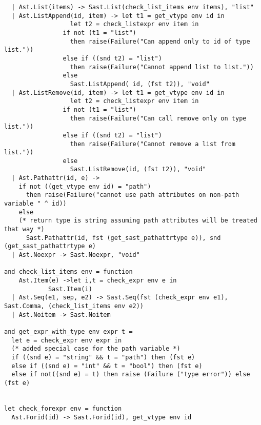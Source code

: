 \documentclass[11pt]{article}
\begin{document}
\begin{listing}[H]
  \begin{verbatim}
  | Ast.List(items) -> Sast.List(check_list_items env items), "list"
  | Ast.ListAppend(id, item) -> let t1 = get_vtype env id in
                  let t2 = check_listexpr env item in
                if not (t1 = "list")
                  then raise(Failure("Can append only to id of type list."))
                else if ((snd t2) = "list")
                  then raise(Failure("Cannot append list to list."))
                else
                  Sast.ListAppend( id, (fst t2)), "void"
  | Ast.ListRemove(id, item) -> let t1 = get_vtype env id in
                  let t2 = check_listexpr env item in
                if not (t1 = "list")
                  then raise(Failure("Can call remove only on type list."))
                else if ((snd t2) = "list")
                  then raise(Failure("Cannot remove a list from list."))
                else
                  Sast.ListRemove(id, (fst t2)), "void"
  | Ast.Pathattr(id, e) ->
    if not ((get_vtype env id) = "path")
      then raise(Failure("cannot use path attributes on non-path variable " ^ id))
    else
    (* return type is string assuming path attributes will be treated that way *)
      Sast.Pathattr(id, fst (get_sast_pathattrtype e)), snd (get_sast_pathattrtype e)
  | Ast.Noexpr -> Sast.Noexpr, "void"

and check_list_items env = function
    Ast.Item(e) ->let i,t = check_expr env e in
            Sast.Item(i)
  | Ast.Seq(e1, sep, e2) -> Sast.Seq(fst (check_expr env e1), Sast.Comma, (check_list_items env e2))
  | Ast.Noitem -> Sast.Noitem

and get_expr_with_type env expr t =
  let e = check_expr env expr in
  (* added special case for the path variable *)
  if ((snd e) = "string" && t = "path") then (fst e)
  else if ((snd e) = "int" && t = "bool") then (fst e)
  else if not((snd e) = t) then raise (Failure ("type error")) else (fst e)


let check_forexpr env = function
  Ast.Forid(id) -> Sast.Forid(id), get_vtype env id

  \end{verbatim}
\end{listing}
\end{document}
